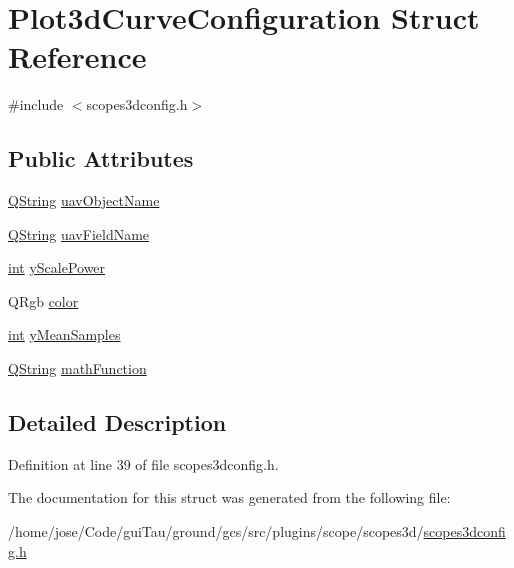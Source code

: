 \hypertarget{struct_plot3d_curve_configuration}{\section{Plot3d\-Curve\-Configuration Struct Reference}
\label{struct_plot3d_curve_configuration}
}


{\ttfamily \#include $<$scopes3dconfig.\-h$>$}

\subsection*{Public Attributes}
\begin{DoxyCompactItemize}
\item 
\hyperlink{group___u_a_v_objects_plugin_gab9d252f49c333c94a72f97ce3105a32d}{Q\-String} \hyperlink{group___scope_plugin_gae997da1be9b0e82a84d8d19292c28984}{uav\-Object\-Name}
\item 
\hyperlink{group___u_a_v_objects_plugin_gab9d252f49c333c94a72f97ce3105a32d}{Q\-String} \hyperlink{group___scope_plugin_ga16c893aa5d7da613ba51f6bd7bf70fc8}{uav\-Field\-Name}
\item 
\hyperlink{ioapi_8h_a787fa3cf048117ba7123753c1e74fcd6}{int} \hyperlink{group___scope_plugin_gafedb70e83328587c7a6e336f7899a247}{y\-Scale\-Power}
\item 
Q\-Rgb \hyperlink{group___scope_plugin_gab12e6f531f6e4242ccbb585aec40b245}{color}
\item 
\hyperlink{ioapi_8h_a787fa3cf048117ba7123753c1e74fcd6}{int} \hyperlink{group___scope_plugin_ga917daaa3cc944ff8bd9e8ae6ed1cfc3b}{y\-Mean\-Samples}
\item 
\hyperlink{group___u_a_v_objects_plugin_gab9d252f49c333c94a72f97ce3105a32d}{Q\-String} \hyperlink{group___scope_plugin_ga344f163230a632804af76085d5ed4ae1}{math\-Function}
\end{DoxyCompactItemize}


\subsection{Detailed Description}


Definition at line 39 of file scopes3dconfig.\-h.



The documentation for this struct was generated from the following file\-:\begin{DoxyCompactItemize}
\item 
/home/jose/\-Code/gui\-Tau/ground/gcs/src/plugins/scope/scopes3d/\hyperlink{scopes3dconfig_8h}{scopes3dconfig.\-h}\end{DoxyCompactItemize}
